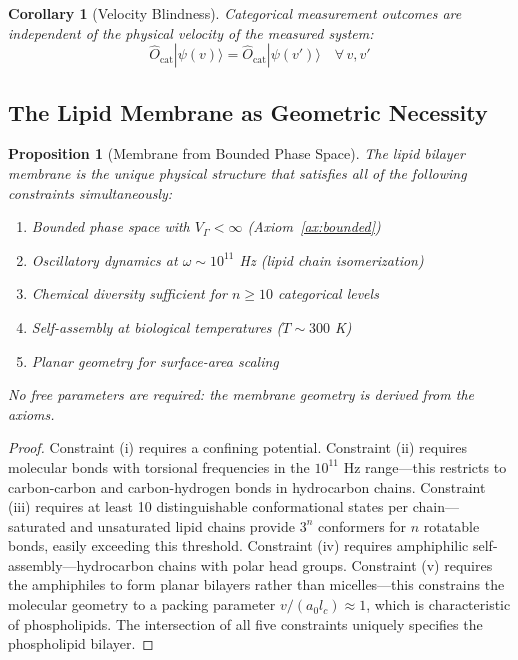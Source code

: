 \documentclass[twocolumn,10pt,a4paper]{article}
\newtheorem{proposition}[theorem]{Proposition}
\newtheorem{corollary}[theorem]{Corollary}
\theoremstyle{definition}
\theoremstyle{remark}
\newcommand{\Ocat}{\hat{O}_{\mathrm{cat}}}
\newcommand{\Vgamma}{V_\Gamma}
\begin{document}
\begin{corollary}[Velocity Blindness]
\label{cor:velocity}
Categorical measurement outcomes are independent of the physical velocity of the measured system:
\begin{equation}
\label{eq:velocity_blindness}
\Ocat |\psi(v)\rangle = \Ocat |\psi(v')\rangle \quad \forall \, v, v'
\end{equation}
\end{corollary}

\subsection{The Lipid Membrane as Geometric Necessity}

\begin{proposition}[Membrane from Bounded Phase Space]
\label{prop:membrane}
The lipid bilayer membrane is the unique physical structure that satisfies all of the following constraints simultaneously:
\begin{enumerate}[label=(\roman*)]
    \item Bounded phase space with $\Vgamma < \infty$ (Axiom~\ref{ax:bounded})
    \item Oscillatory dynamics at $\omega \sim 10^{11}$ Hz (lipid chain isomerization)
    \item Chemical diversity sufficient for $n \geq 10$ categorical levels
    \item Self-assembly at biological temperatures ($T \sim 300$ K)
    \item Planar geometry for surface-area scaling
\end{enumerate}
No free parameters are required: the membrane geometry is derived from the axioms.
\end{proposition}

\begin{proof}
Constraint (i) requires a confining potential. Constraint (ii) requires molecular bonds with torsional frequencies in the $10^{11}$ Hz range---this restricts to carbon-carbon and carbon-hydrogen bonds in hydrocarbon chains. Constraint (iii) requires at least 10 distinguishable conformational states per chain---saturated and unsaturated lipid chains provide $3^n$ conformers for $n$ rotatable bonds, easily exceeding this threshold. Constraint (iv) requires amphiphilic self-assembly---hydrocarbon chains with polar head groups. Constraint (v) requires the amphiphiles to form planar bilayers rather than micelles---this constrains the molecular geometry to a packing parameter $v/(a_0 l_c) \approx 1$, which is characteristic of phospholipids. The intersection of all five constraints uniquely specifies the phospholipid bilayer. \qedhere
\end{proof}
\end{document}
